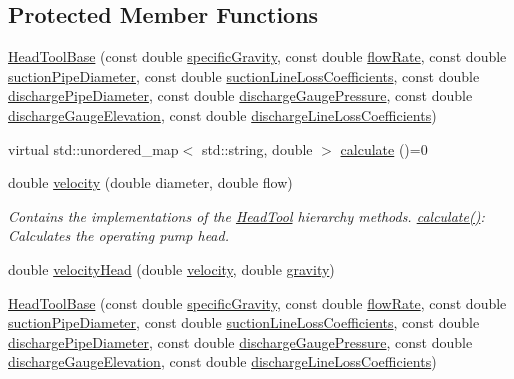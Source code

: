\subsection*{Protected Member Functions}
\begin{DoxyCompactItemize}
\item 
\hyperlink{class_head_tool_base_ae5bb2325e1266c64b16937d964aea14f}{Head\+Tool\+Base} (const double \hyperlink{class_head_tool_base_ae5af2380fb5db2c25281ef663a5fb65f}{specific\+Gravity}, const double \hyperlink{class_head_tool_base_acf4c03cb62cbf63aba017ce063989fbc}{flow\+Rate}, const double \hyperlink{class_head_tool_base_a357365fc5ef346ce7bcb089c9d1a95e1}{suction\+Pipe\+Diameter}, const double \hyperlink{class_head_tool_base_ac74c6f6f8ab387efe7b77e0ce6ecd84e}{suction\+Line\+Loss\+Coefficients}, const double \hyperlink{class_head_tool_base_a126a397bd3d87b68864e1962c70bb45e}{discharge\+Pipe\+Diameter}, const double \hyperlink{class_head_tool_base_a39c854f13b16967e02a67cd1aaee07c4}{discharge\+Gauge\+Pressure}, const double \hyperlink{class_head_tool_base_a9ed2160992f8da2e335d919cf9aedd08}{discharge\+Gauge\+Elevation}, const double \hyperlink{class_head_tool_base_a147c035c7422406c594c5fd42ab11eb0}{discharge\+Line\+Loss\+Coefficients})
\item 
virtual std\+::unordered\+\_\+map$<$ std\+::string, double $>$ \hyperlink{class_head_tool_base_ab8df8f908827ce45dc5e769ea0e10f0b}{calculate} ()=0
\item 
double \hyperlink{class_head_tool_base_a0412306c4adda62e5840342b0d26ac06}{velocity} (double diameter, double flow)
\begin{DoxyCompactList}\small\item\em Contains the implementations of the \hyperlink{class_head_tool}{Head\+Tool} hierarchy methods. \hyperlink{class_head_tool_base_ab8df8f908827ce45dc5e769ea0e10f0b}{calculate()}\+: Calculates the operating pump head. \end{DoxyCompactList}\item 
double \hyperlink{class_head_tool_base_a461c3d53a92763ca08c9a5bbcbef83c3}{velocity\+Head} (double \hyperlink{class_head_tool_base_a0412306c4adda62e5840342b0d26ac06}{velocity}, double \hyperlink{class_head_tool_base_a687da90a9c2f44cb51061d9fad30c002}{gravity})
\item 
\hyperlink{class_head_tool_base_ae5bb2325e1266c64b16937d964aea14f}{Head\+Tool\+Base} (const double \hyperlink{class_head_tool_base_ae5af2380fb5db2c25281ef663a5fb65f}{specific\+Gravity}, const double \hyperlink{class_head_tool_base_acf4c03cb62cbf63aba017ce063989fbc}{flow\+Rate}, const double \hyperlink{class_head_tool_base_a357365fc5ef346ce7bcb089c9d1a95e1}{suction\+Pipe\+Diameter}, const double \hyperlink{class_head_tool_base_ac74c6f6f8ab387efe7b77e0ce6ecd84e}{suction\+Line\+Loss\+Coefficients}, const double \hyperlink{class_head_tool_base_a126a397bd3d87b68864e1962c70bb45e}{discharge\+Pipe\+Diameter}, const double \hyperlink{class_head_tool_base_a39c854f13b16967e02a67cd1aaee07c4}{discharge\+Gauge\+Pressure}, const double \hyperlink{class_head_tool_base_a9ed2160992f8da2e335d919cf9aedd08}{discharge\+Gauge\+Elevation}, const double \hyperlink{class_head_tool_base_a147c035c7422406c594c5fd42ab11eb0}{discharge\+Line\+Loss\+Coefficients})

\end{DoxyCompactItemize}
